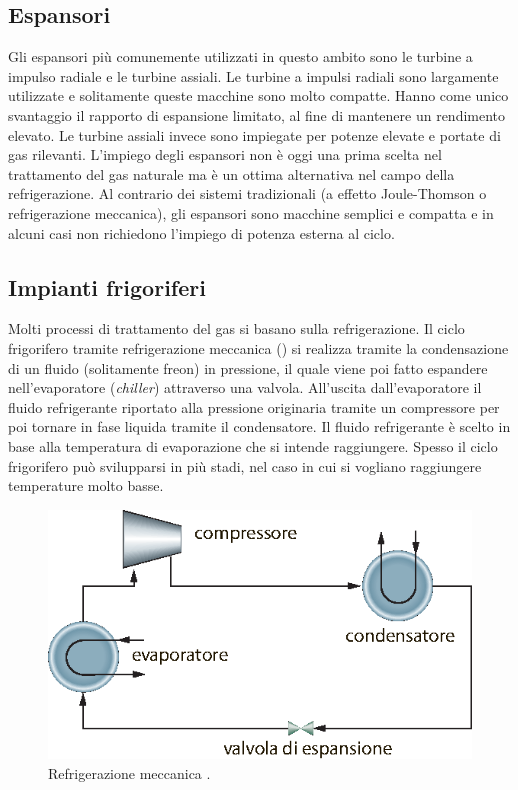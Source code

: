 \subsection{Espansori}
Gli espansori più comunemente utilizzati in questo ambito sono le turbine a impulso radiale e le turbine assiali. Le turbine a impulsi radiali sono largamente utilizzate e solitamente queste macchine sono molto compatte. Hanno come unico svantaggio il rapporto di espansione limitato, al fine di mantenere un rendimento elevato. Le turbine assiali invece sono impiegate per potenze elevate e portate di gas rilevanti. L'impiego degli espansori non è oggi una prima scelta nel trattamento del gas naturale ma è un ottima alternativa nel campo della refrigerazione. Al contrario dei sistemi tradizionali (a effetto Joule-Thomson o refrigerazione meccanica), gli espansori sono macchine semplici e compatta e in alcuni casi non richiedono l'impiego di potenza esterna al ciclo.

\subsection{Impianti frigoriferi}
Molti processi di trattamento del gas si basano sulla refrigerazione. Il ciclo frigorifero tramite refrigerazione meccanica () si realizza tramite la condensazione di un fluido (solitamente freon) in pressione, il quale viene poi fatto espandere nell'evaporatore (\textit{chiller}) attraverso una valvola. All'uscita dall'evaporatore il fluido refrigerante riportato alla pressione originaria tramite un compressore per poi tornare in fase liquida tramite il condensatore. Il fluido refrigerante è scelto in base alla temperatura di evaporazione che si intende raggiungere. Spesso il ciclo frigorifero può svilupparsi in più stadi, nel caso in cui si vogliano raggiungere temperature molto basse.

\begin{figure}[htbp]
    \centering
    \includegraphics[width=.5\textwidth]{fig/impianti/frigorifero.eps}
    \caption{Refrigerazione meccanica \parencite{bianco2005impiantigas}.}
    \label{fig:frigorifero}
\end{figure}

